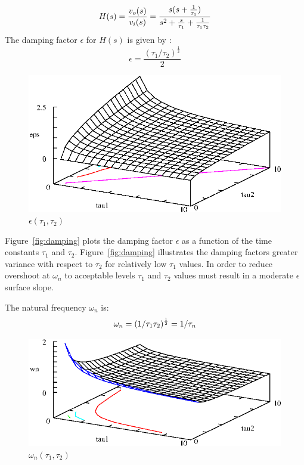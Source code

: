 \begin{equation}
	H(s) = \frac{v_o(s)}{v_i(s)} = \frac{s(s+\frac{1}{\tau_1})}{s^2 +
	\frac{s}{\tau_1} + \frac{1}{\tau_1\/\tau_2}}
\label{eq:simp-trans}
\end{equation}
The damping factor $\epsilon$ for $H(s)$ is given by : 
\begin{equation}
	\epsilon = \frac{(\tau_1/\tau_2)^\frac{1}{2}}{2}
\end{equation}

\begin{figure}[htbp]
	\begin{center}
	\includegraphics[width=\textwidth]{damping.eps}
	\caption{$\epsilon(\tau_1, \tau_2)$}
	\label{fig:damping}
	\end{center}
\end{figure}

Figure~\vref{fig:damping} plots the damping factor $\epsilon$ as a
function of the time constants $\tau_1$ and
$\tau_2$. Figure~\vref{fig:damping} illustrates the damping factors
greater variance with respect to $\tau_2$ for relatively low $\tau_1$
values. In order to reduce overshoot at $\omega_n$ to acceptable
levels $\tau_1$ and $\tau_2$ values must result in a moderate
$\epsilon$ surface slope.


The natural frequency $\omega_n$ is:
\begin{equation}
	\omega_n = (1/\tau_1\/\tau_2)^\frac{1}{2} = 1/\tau_n
	\label{eq:wn}
\end{equation}

\begin{figure}[htbp]
	\includegraphics[width=\textwidth]{natural.eps}
	\caption{$\omega_n(\tau_1, \tau_2)$}
	\label{fig:natural}
\end{figure}


